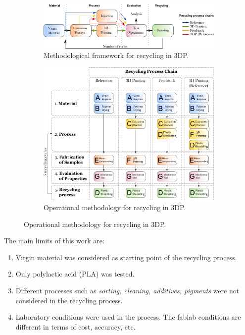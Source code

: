 \begin{figure}[H]
	\centering
	
	\begin{subfigure}{0.55\textwidth}
		\includegraphics[width=\textwidth]{Figures/Recycling-framework.pdf}
		\caption{Methodological framework for recycling in 3DP.}
		\label{Recycling.Framework}
	\end{subfigure}
	\hfill
	\begin{subfigure}{0.4\textwidth}
		\includegraphics[width=\textwidth]{Figures/Operational-Methodology.pdf} 
		\caption{Operational methodology for recycling in 3DP.}
		\label{Operational.Methodology}		
	\end{subfigure}

		\label{Recycling.3DP}
\end{figure}

The main limits of this work are:

\begin{enumerate}
	\item Virgin material was considered as starting point of the recycling process.
	\item Only polylactic acid (PLA) was tested.
	\item Different processes such as \textit{sorting, cleaning, additives, pigments} were not considered in the recycling process.
	\item Laboratory conditions were used in the process. The fablab conditions are different in terms of cost, accuracy, etc.
\end{enumerate}

